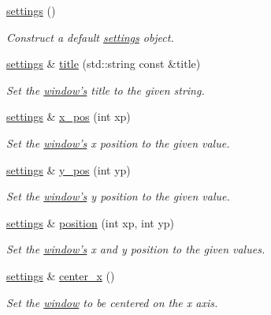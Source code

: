 \begin{DoxyCompactItemize}
\item 
\hyperlink{classgfx_1_1window_1_1settings_a7e8147d481d94d7e36c10716c838af67}{settings} ()
\begin{DoxyCompactList}\small\item\em Construct a default \hyperlink{classgfx_1_1window_1_1settings}{settings} object. \end{DoxyCompactList}\item 
\hyperlink{classgfx_1_1window_1_1settings}{settings} \& \hyperlink{classgfx_1_1window_1_1settings_a74a35d05012f3e5d8f92bd115035fe19}{title} (std\-::string const \&title)
\begin{DoxyCompactList}\small\item\em Set the \hyperlink{classgfx_1_1window}{window's} title to the given string. \end{DoxyCompactList}\item 
\hyperlink{classgfx_1_1window_1_1settings}{settings} \& \hyperlink{classgfx_1_1window_1_1settings_a20620f7a3d4b757ba3d2218f78ae0596}{x\-\_\-pos} (int xp)
\begin{DoxyCompactList}\small\item\em Set the \hyperlink{classgfx_1_1window}{window's} x position to the given value. \end{DoxyCompactList}\item 
\hyperlink{classgfx_1_1window_1_1settings}{settings} \& \hyperlink{classgfx_1_1window_1_1settings_adefc601192dab8f54c3d3b323e3d3c65}{y\-\_\-pos} (int yp)
\begin{DoxyCompactList}\small\item\em Set the \hyperlink{classgfx_1_1window}{window's} y position to the given value. \end{DoxyCompactList}\item 
\hyperlink{classgfx_1_1window_1_1settings}{settings} \& \hyperlink{classgfx_1_1window_1_1settings_a3ef178046c2b742516dd1d6a247826ba}{position} (int xp, int yp)
\begin{DoxyCompactList}\small\item\em Set the \hyperlink{classgfx_1_1window}{window's} x and y position to the given values. \end{DoxyCompactList}\item 
\hyperlink{classgfx_1_1window_1_1settings}{settings} \& \hyperlink{classgfx_1_1window_1_1settings_a7efa57ade4d629427f4c53bbb9f49df8}{center\-\_\-x} ()
\begin{DoxyCompactList}\small\item\em Set the \hyperlink{classgfx_1_1window}{window} to be centered on the x axis. \end{DoxyCompactList}\item 

\end{DoxyCompactItemize}
